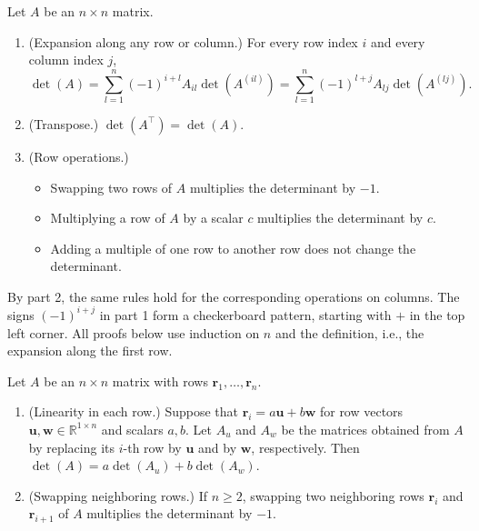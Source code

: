 \begin{theorem}\label{L1-thm:det-props}
    Let $A$ be an $n \times n$ matrix.
    \begin{enumerate}
        \item (Expansion along any row or column.) For every row index $i$ and every column index $j$,
        \[\det(A) = \sum_{l=1}^n (-1)^{i+l} A_{il} \det(A^{(il)}) = \sum_{l=1}^n (-1)^{l+j} A_{lj} \det(A^{(lj)}).\]
        \item (Transpose.) $\det(A^\top) = \det(A)$.
        \item (Row operations.)
        \begin{itemize}
            \item Swapping two rows of $A$ multiplies the determinant by $-1$.
            \item Multiplying a row of $A$ by a scalar $c$ multiplies the determinant by $c$.
            \item Adding a multiple of one row to another row does not change the determinant.
        \end{itemize}
    \end{enumerate}
\end{theorem}

By part 2, the same rules hold for the corresponding operations on columns. The signs $(-1)^{i+j}$ in part 1 form a checkerboard pattern, starting with $+$ in the top left corner. All proofs below use induction on $n$ and the definition, i.e., the expansion along the first row.

\begin{lemma}\label{L1-lem:det-rows}
    Let $A$ be an $n \times n$ matrix with rows $\mathbf{r}_1, \ldots, \mathbf{r}_n$.
    \begin{enumerate}
        \item (Linearity in each row.) Suppose that $\mathbf{r}_i = a\mathbf{u} + b\mathbf{w}$ for row vectors $\mathbf{u}, \mathbf{w} \in \mathbb{R}^{1 \times n}$ and scalars $a, b$. Let $A_u$ and $A_w$ be the matrices obtained from $A$ by replacing its $i$-th row by $\mathbf{u}$ and by $\mathbf{w}$, respectively. Then $\det(A) = a\det(A_u) + b\det(A_w)$.
        \item (Swapping neighboring rows.) If $n \geq 2$, swapping two neighboring rows $\mathbf{r}_i$ and $\mathbf{r}_{i+1}$ of $A$ multiplies the determinant by $-1$.
    \end{enumerate}
\end{lemma}

